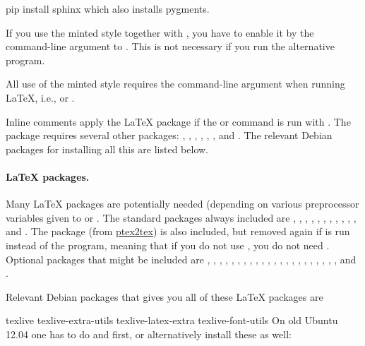 \documentclass[%
oneside,                 %
final,                   %
10pt]{article}
\begin{document}
\bsys
pip install sphinx
\esys
which also installs pygments.

If you use the minted style together with , you have to
enable it by the  command-line argument to .
This is not necessary if you run the alternative  program.

All use of the minted style requires the  command-line
argument when running {\LaTeX}, i.e.,  or .

Inline comments apply the  {\LaTeX} package if the 
or  command is run with .  The
 package requires several other packages: ,
, , , , , and . The
relevant Debian packages for installing all this are listed below.

\paragraph{{\LaTeX} packages.}
Many {\LaTeX} packages are potentially needed (depending on various
preprocessor variables given to  or .  The
standard packages always included are , , ,
, , , , , ,
, , and .  The  package (from
\href{{http://code.google.com/p/ptex2tex}}{ptex2tex}) is also included, but
removed again if  is run instead of the 
program, meaning that if you do not use , you do not need
. Optional packages that might be included are ,
, , , , , ,
, , , , , , ,
, , , , , ,
, , and .

Relevant Debian packages that gives you all of these {\LaTeX} packages are

\bccq
texlive
texlive-extra-utils
texlive-latex-extra
texlive-font-utils
\eccq
On old Ubuntu 12.04 one has to do  and  first, or alternatively install these as well:
\end{document}
